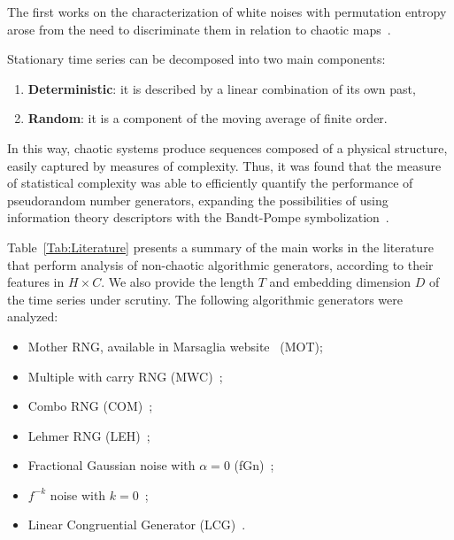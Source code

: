 The first works on the characterization of white noises with permutation entropy arose from the need to discriminate them in relation to chaotic maps~\citep{rosso2013characterization, xiong2020complexity}.

Stationary time series can be decomposed into two main components:
\begin{enumerate}
    \item \textbf{Deterministic}: it is described by a linear combination of its own past,
    \item \textbf{Random}: it is a component of the moving average of finite order.
\end{enumerate}
In this way, chaotic systems produce sequences composed of a physical structure, easily captured by measures of complexity.
Thus, it was found that the measure of statistical complexity was able to efficiently quantify the performance of pseudorandom number generators, expanding the possibilities of using information theory descriptors with the Bandt-Pompe symbolization~\citep{larrondo2002statistical, gonzalez2005statistical, RandomNumberGeneratorsCausality}.

Table~\ref{Tab:Literature} presents a summary of the main works in the literature that perform analysis of non-chaotic algorithmic generators, according to their features in $H \times C$.
We also provide the length $T$ and embedding dimension
$D$ of the time series under scrutiny. 
The following algorithmic generators were analyzed:
\begin{itemize}
    \item Mother RNG, available in Marsaglia website~\citep{marsaglia1994yet} (MOT);
    \item Multiple with carry RNG (MWC)~\citep{marsaglia1994yet};
    \item Combo RNG (COM)~\citep{marsaglia1994yet};
    \item Lehmer RNG (LEH)~\citep{payne1969coding};
    \item Fractional Gaussian noise with $\alpha = 0$ (fGn)~\citep{bardet2003generators};
    \item $f^{-k}$ noise with $k = 0$~\citep{larrondo2012matlab};
    \item Linear Congruential Generator (LCG)~\citep{knuth1997sorting}.
\end{itemize}

